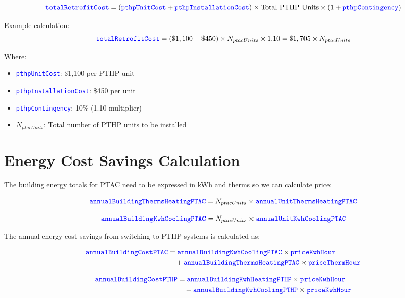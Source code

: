 \documentclass{article}
\newcommand{\code}[1]{\textcolor{blue}{\texttt{#1}}}
\begin{document}
\begin{equation}
\code{totalRetrofitCost} = (\code{pthpUnitCost} + \code{pthpInstallationCost}) \times \text{Total PTHP Units} \times (1 + \code{pthpContingency})
\end{equation}

Example calculation:
\begin{equation}
\code{totalRetrofitCost} = (\$1,100 + \$450) \times N_{ptacUnits} \times 1.10 = \$1,705 \times N_{ptacUnits}
\end{equation}

Where:
\begin{itemize}
    \item \code{pthpUnitCost}: \$1,100 per PTHP unit
    \item \code{pthpInstallationCost}: \$450 per unit
    \item \code{pthpContingency}: 10\% (1.10 multiplier)
    \item $N_{ptacUnits}$: Total number of PTHP units to be installed
\end{itemize}

\section{Energy Cost Savings Calculation}

The building energy totals for PTAC need to be expressed in kWh and therms so we can calculate price:

\begin{equation}
\code{annualBuildingThermsHeatingPTAC} = N_{ptacUnits} \times \code{annualUnitThermsHeatingPTAC}
\end{equation}

\begin{equation}
\code{annualBuildingKwhCoolingPTAC} = N_{ptacUnits} \times \code{annualUnitKwhCoolingPTAC}
\end{equation}

The annual energy cost savings from switching to PTHP systems is calculated as:

\begin{align}
\code{annualBuildingCostPTAC} &= \code{annualBuildingKwhCoolingPTAC} \times \code{priceKwhHour} \nonumber \\
&\quad + \code{annualBuildingThermsHeatingPTAC} \times \code{priceThermHour}
\end{align}

\begin{align}
\code{annualBuildingCostPTHP} &= \code{annualBuildingKwhHeatingPTHP} \times \code{priceKwhHour} \nonumber \\
&\quad + \code{annualBuildingKwhCoolingPTHP} \times \code{priceKwhHour}
\end{align}
\end{document}
